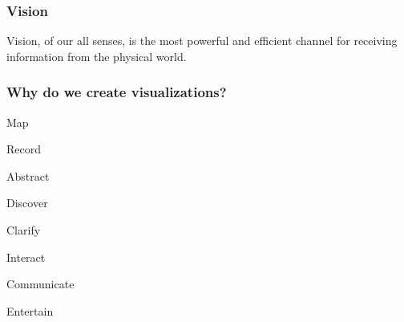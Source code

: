 \documentclass[12pt]{beamer}\usepackage[]{graphicx}\usepackage[]{color}
\begin{document}
{ %
    \begin{frame}[plain]
     \end{frame}
}


\begin{frame}
\frametitle{Vision}

\Large Vision, of our all senses, is the most powerful and efficient 
{\hilit channel for receiving information} from the physical world.

\end{frame}


\begin{frame}
\begin{center}
\Huge{}
\end{center}
\end{frame}


\begin{frame}
\frametitle{Why do we create visualizations?}

\bi
  \item Map
  \item Record
  \item Abstract
  \item Discover
  \item Clarify
  \item Interact
  \item Communicate
  \item Entertain
\ei

\end{frame}
\end{document}
